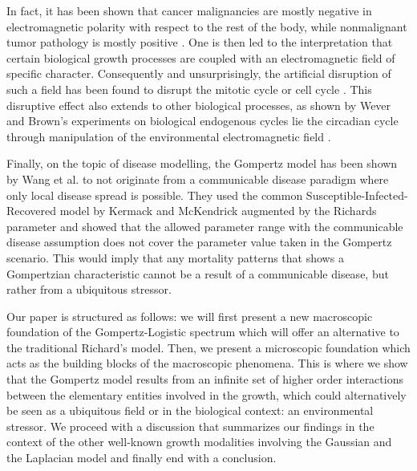 \documentclass{article}
\begin{document}
In fact, it has been shown that cancer malignancies are mostly negative in electromagnetic polarity with respect to the rest of the body, while nonmalignant tumor pathology is mostly positive \cite{langman1949technique}. One is then led to the interpretation that certain biological growth processes are coupled with an electromagnetic field of specific character. Consequently and unsurprisingly, the artificial disruption of such a field has been found to disrupt the mitotic cycle or cell cycle \cite{goodman1983pulsing,liboff1981alternating,norton1984bioelectric,liboff1984time}. This disruptive effect also extends to other biological processes, as shown by Wever and Brown's experiments on biological endogenous cycles lie the circadian cycle through manipulation of the environmental electromagnetic field \cite{brown1976biological,wever1974elf}. 

Finally, on the topic of disease modelling, the Gompertz model has been shown by Wang et al. \cite{wang2012richards} to not originate from a communicable disease paradigm where only local disease spread is possible. They used the common Susceptible-Infected-Recovered model by Kermack and McKendrick \cite{kermack1927contribution} augmented by the Richards parameter and showed that the allowed parameter range with the communicable disease assumption does not cover the parameter value taken in the Gompertz scenario. This would imply that any mortality patterns that shows a Gompertzian characteristic cannot be a result of a communicable disease, but rather from a ubiquitous stressor. 

Our paper is structured as follows: we will first present a new macroscopic foundation of the Gompertz-Logistic spectrum which will offer an alternative to the traditional Richard's model. Then, we present a microscopic foundation which acts as the building blocks of the macroscopic phenomena. This is where we show that the Gompertz model results from an infinite set of higher order interactions between the elementary entities involved in the growth, which could alternatively be seen as a ubiquitous field or in the biological context: an environmental stressor. We proceed with a discussion that summarizes our findings in the context of the other well-known growth modalities involving the Gaussian and the Laplacian model and finally end with a conclusion.



  
\end{document}

